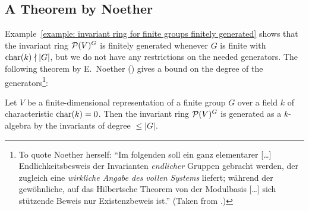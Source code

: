 \subsection{A Theorem by Noether}


\begin{fluff}
  Example~\ref{example: invariant ring for finite groups finitely generated} shows that the invariant ring $\mathcal{P}(V)^G$ is finitely generated whenever $G$ is finite with $\operatorname{char}(k) \nmid |G|$, but we do not have any restrictions on the needed generators.
  The following theorem by E.\ Noether (\cite{Noether1915}) gives a bound on the degree of the generators\footnote{
  To quote Noether herself:
  \enquote{Im folgenden soll ein ganz elementarer [\dots] Endlichkeitsbesweis der Invarianten \emph{endlicher} Gruppen gebracht werden, der zugleich eine \emph{wirkliche Angabe des vollen Systems} liefert;
  während der gewöhnliche, auf das Hilbertsche Theorem von der Modulbasis […] sich stützende Beweis nur Existenzbeweis ist.}
  (Taken from \cite{Noether1915}.)
  }:
\end{fluff}


\begin{theorem}[Noether]
  Let $V$ be a finite-dimensional representation of a finite group $G$ over a field $k$ of characteristic $\operatorname{char}(k) = 0$.
  Then the invariant ring $\mathcal{P}(V)^G$ is generated as a $k$-algebra by the invariants of degree $\leq |G|$.
\end{theorem}


